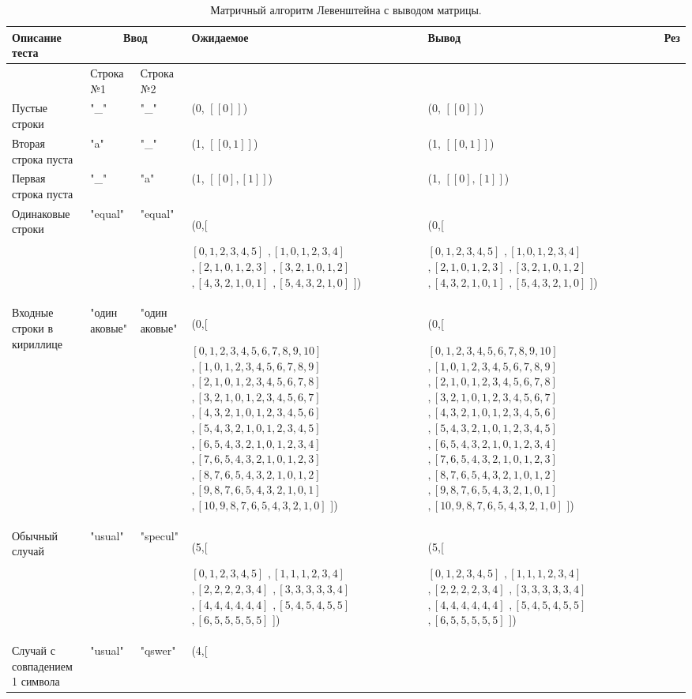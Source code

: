 \documentclass[12pt]{report}
\begin{document}
\begin{center}
	\begin{longtable}[H]{|p{2cm}|p{1.5cm}|p{1.5cm}|p{4.7cm}|p{4.7cm}|c|}
		\caption{\label{tab:test5} Матричный алгоритм Левенштейна с выводом матрицы.}\\
		\hline
		Описание теста & \multicolumn{2}{|c|}{Ввод} & Ожидаемое & Вывод & Рез\\
		\hline
		& Строка №1 & Строка №2 & & & \\
		\hline
		Пустые строки & "\_" & "\_" & (0, $[[0]]$) & (0, $[[0]]$) & \checkmark\\
		\hline
		Вторая строка пуста & "a" & "\_" & (1, $[[0,1]]$) & (1, $[[0,1]]$) & \checkmark\\
		\hline
		Первая строка пуста & "\_" & "a" & (1, $[[0],[1]]$) & (1, $[[0],[1]]$) & \checkmark\\
		\hline
		Одинаковые строки & "equal" & "equal" & (0,[
		
		$[0,1,2,3,4,5]$
		$,[1,0,1,2,3,4]$
		$,[2,1,0,1,2,3]$
		$,[3,2,1,0,1,2]$
		$,[4,3,2,1,0,1]$
		$,[5,4,3,2,1,0]$
		]) & (0,[
		
		$[0,1,2,3,4,5]$
		$,[1,0,1,2,3,4]$
		$,[2,1,0,1,2,3]$
		$,[3,2,1,0,1,2]$
		$,[4,3,2,1,0,1]$
		$,[5,4,3,2,1,0]$
		]) & \checkmark\\
		\hline
		Входные строки в кириллице & "один
		аковые" & "один
		аковые" & (0,[
		
		$[0,1,2,3,4,5,6,7,8,9,10]$
		$,[1,0,1,2,3,4,5,6,7,8,9]$
		$,[2,1,0,1,2,3,4,5,6,7,8]$
		$,[3,2,1,0,1,2,3,4,5,6,7]$
		$,[4,3,2,1,0,1,2,3,4,5,6]$
		$,[5,4,3,2,1,0,1,2,3,4,5]$
		$,[6,5,4,3,2,1,0,1,2,3,4]$
		$,[7,6,5,4,3,2,1,0,1,2,3]$
		$,[8,7,6,5,4,3,2,1,0,1,2]$
		$,[9,8,7,6,5,4,3,2,1,0,1]$
		$,[10,9,8,7,6,5,4,3,2,1,0]$
		]) & (0,[
		
		$[0,1,2,3,4,5,6,7,8,9,10]$
		$,[1,0,1,2,3,4,5,6,7,8,9]$
		$,[2,1,0,1,2,3,4,5,6,7,8]$
		$,[3,2,1,0,1,2,3,4,5,6,7]$
		$,[4,3,2,1,0,1,2,3,4,5,6]$
		$,[5,4,3,2,1,0,1,2,3,4,5]$
		$,[6,5,4,3,2,1,0,1,2,3,4]$
		$,[7,6,5,4,3,2,1,0,1,2,3]$
		$,[8,7,6,5,4,3,2,1,0,1,2]$
		$,[9,8,7,6,5,4,3,2,1,0,1]$
		$,[10,9,8,7,6,5,4,3,2,1,0]$
		]) & \checkmark\\
		\hline
		Обычный случай & "usual" & "specul" & (5,[
		
		$[0,1,2,3,4,5]$
		$,[1,1,1,2,3,4]$
		$,[2,2,2,2,3,4]$
		$,[3,3,3,3,3,4]$
		$,[4,4,4,4,4,4]$
		$,[5,4,5,4,5,5]$
		$,[6,5,5,5,5,5]$
		]) & (5,[
		
		$[0,1,2,3,4,5]$
		$,[1,1,1,2,3,4]$
		$,[2,2,2,2,3,4]$
		$,[3,3,3,3,3,4]$
		$,[4,4,4,4,4,4]$
		$,[5,4,5,4,5,5]$
		$,[6,5,5,5,5,5]$
		]) & \checkmark\\
		\hline
		Случай с совпадением 1 символа & "usual" & "qswer" & (4,[
		

\end{longtable}
\end{center}
\end{document}
